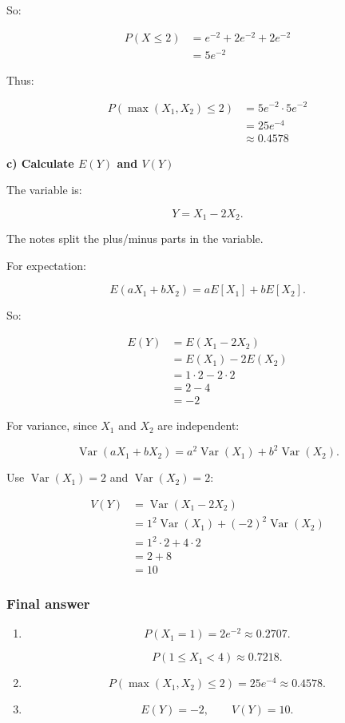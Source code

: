 \documentclass[10pt]{article}
\begin{document}
So:

\begin{align*}
P(X\leq 2)
&=
e^{-2}+2e^{-2}+2e^{-2} \\[2mm]
&=
5e^{-2}
\end{align*}

Thus:

\begin{align*}
P(\max(X_1,X_2)\leq 2)
&=
5e^{-2}\cdot 5e^{-2} \\[2mm]
&=
25e^{-4} \\[2mm]
&\approx 0.4578
\end{align*}

\textbf{c) Calculate $E(Y)$ and $V(Y)$}

The variable is:

\[
Y=X_1-2X_2.
\]

The notes split the plus/minus parts in the variable.

For expectation:

\[
E(aX_1+bX_2)
=
aE[X_1]+bE[X_2].
\]

So:

\begin{align*}
E(Y)
&=
E(X_1-2X_2) \\[2mm]
&=
E(X_1)-2E(X_2) \\[2mm]
&=
1\cdot 2-2\cdot 2 \\[2mm]
&=
2-4 \\[2mm]
&=-2
\end{align*}

For variance, since $X_1$ and $X_2$ are independent:

\[
\operatorname{Var}(aX_1+bX_2)
=
a^2\operatorname{Var}(X_1)
+b^2\operatorname{Var}(X_2).
\]

Use $\operatorname{Var}(X_1)=2$ and
$\operatorname{Var}(X_2)=2$:

\begin{align*}
V(Y)
&=
\operatorname{Var}(X_1-2X_2) \\[2mm]
&=
1^2\operatorname{Var}(X_1)
+(-2)^2\operatorname{Var}(X_2) \\[2mm]
&=
1^2\cdot 2+4\cdot 2 \\[2mm]
&=
2+8 \\[2mm]
&=10
\end{align*}

\subsubsection*{Final answer}
\begin{enumerate}[label=\alph*)]
\item
\[
P(X_1=1)=2e^{-2}\approx 0.2707.
\]

\[
P(1\leq X_1<4)\approx 0.7218.
\]

\item
\[
P(\max(X_1,X_2)\leq 2)
=25e^{-4}\approx 0.4578.
\]

\item
\[
E(Y)=-2,
\qquad
V(Y)=10.
\]
\end{enumerate}
\end{document}
